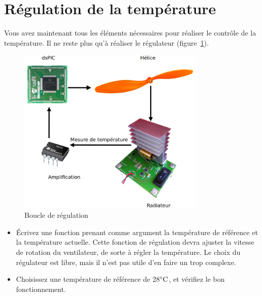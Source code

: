 \documentclass[11pt,a4paper]{article}
\theoremstyle{definition}%
\begin{document}
\section{Régulation de la température}
Vous avez maintenant tous les éléments nécessaires pour réaliser le contrôle de la température.
Il ne reste plus qu’à réaliser le régulateur (figure~\ref{fig:regulation}).

\begin{figure}[h]
\center
\includegraphics[width=0.8\textwidth]{regulation}
\caption{Boucle de régulation}
\label{fig:regulation}
\end{figure}

\begin{itemize}
	\item Écrivez une fonction prenant comme argument la température de référence et la température actuelle.
	Cette fonction de régulation devra ajuster la vitesse de rotation du ventilateur, de sorte à régler la température.
	Le choix du régulateur est libre, mais il n’est pas utile d’en faire un trop complexe.
	\item Choisissez une température de référence de 28$\celsius$, et vérifiez le bon fonctionnement.
\end{itemize}
\end{document}
